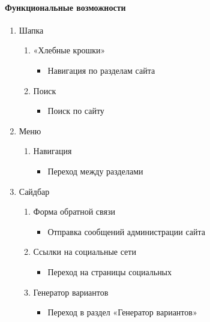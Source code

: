 \paragraph{Функциональные возможности}
\begin{enumerate}
	\item Шапка
	\begin{enumerate}
		\item «Хлебные крошки»
		\begin{itemize}
			\item Навигация по разделам сайта
		\end{itemize}
		\item Поиск
		\begin{itemize}
			\item Поиск по сайту
		\end{itemize}
	\end{enumerate}

	\item Меню
	\begin{enumerate}
		\item Навигация
		\begin{itemize}
			\item Переход между разделами
		\end{itemize}
	\end{enumerate}

	\item Сайдбар
	\begin{enumerate}
		\item Форма обратной связи
		\begin{itemize}
			\item Отправка сообщений администрации сайта
		\end{itemize}

		\item Ссылки на социальные сети
		\begin{itemize}
			\item Переход на страницы социальных
		\end{itemize}

		\item Генератор вариантов
		\begin{itemize}
			\item Переход в раздел «Генератор вариантов»
		\end{itemize}
	\end{enumerate}


\end{enumerate}
